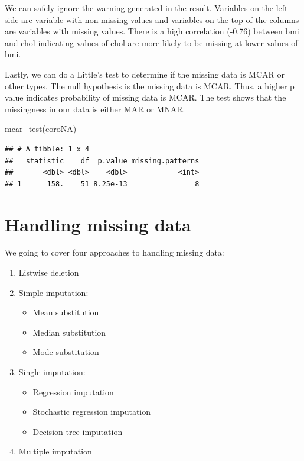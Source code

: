 \documentclass[
  10pt,
]{krantz}
\newenvironment{Shaded}{\begin{snugshade}}{\end{snugshade}}
\newcommand{\FunctionTok}[1]{\textcolor[rgb]{0.00,0.00,0.00}{#1}}
\newcommand{\NormalTok}[1]{#1}
\providecommand{\tightlist}{%
  \setlength{\itemsep}{0pt}\setlength{\parskip}{0pt}}
\begin{document}
We can safely ignore the warning generated in the result. Variables on the left side are variable with non-missing values and variables on the top of the columns are variables with missing values. There is a high correlation (-0.76) between bmi and chol indicating values of chol are more likely to be missing at lower values of bmi.

Lastly, we can do a Little's test to determine if the missing data is MCAR or other types. The null hypothesis is the missing data is MCAR. Thus, a higher p value indicates probability of missing data is MCAR. The test shows that the missingness in our data is either MAR or MNAR.

\begin{Shaded}
\begin{Highlighting}[]
\FunctionTok{mcar\_test}\NormalTok{(coroNA)}
\end{Highlighting}
\end{Shaded}

\begin{verbatim}
## # A tibble: 1 x 4
##   statistic    df  p.value missing.patterns
##       <dbl> <dbl>    <dbl>            <int>
## 1      158.    51 8.25e-13                8
\end{verbatim}

\hypertarget{handling-missing-data}{%
\section{Handling missing data}\label{handling-missing-data}}

We going to cover four approaches to handling missing data:

\begin{enumerate}
\def\labelenumi{\arabic{enumi}.}
\tightlist
\item
  Listwise deletion
\item
  Simple imputation:

  \begin{itemize}
  \tightlist
  \item
    Mean substitution
  \item
    Median substitution
  \item
    Mode substitution
  \end{itemize}
\item
  Single imputation:

  \begin{itemize}
  \tightlist
  \item
    Regression imputation
  \item
    Stochastic regression imputation
  \item
    Decision tree imputation
  \end{itemize}
\item
  Multiple imputation
\end{enumerate}
\end{document}
